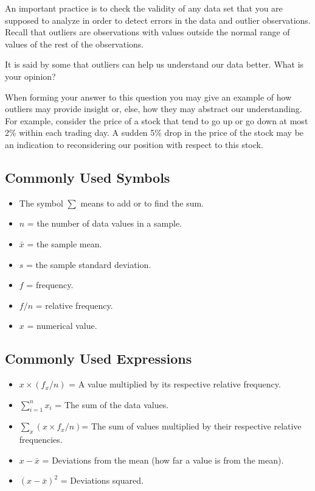\documentclass[]{krantz}
\theoremstyle{definition}
\theoremstyle{definition}
\theoremstyle{definition}
\theoremstyle{remark}
\begin{document}
An important practice is to check the validity of any data set that you
are supposed to analyze in order to detect errors in the data and
outlier observations. Recall that outliers are observations with values
outside the normal range of values of the rest of the observations.

It is said by some that outliers can help us understand our data better.
What is your opinion?

When forming your answer to this question you may give an example of how
outliers may provide insight or, else, how they may abstract our
understanding. For example, consider the price of a stock that tend to
go up or go down at most 2\% within each trading day. A sudden 5\% drop in
the price of the stock may be an indication to reconsidering our
position with respect to this stock.

\hypertarget{commonly-used-symbols}{%
\subsection*{Commonly Used Symbols}\label{commonly-used-symbols}}


\begin{itemize}
\item
  The symbol \(\sum\) means to add or to find the sum.
\item
  \(n\) = the number of data values in a sample.
\item
  \(\bar x\) = the sample mean.
\item
  \(s\) = the sample standard deviation.
\item
  \(f\) = frequency.
\item
  \(f/n\) = relative frequency.
\item
  \(x\) = numerical value.
\end{itemize}

\hypertarget{commonly-used-expressions}{%
\subsection*{Commonly Used Expressions}\label{commonly-used-expressions}}


\begin{itemize}
\item
  \(x \times (f_x/n)\) = A value multiplied by its respective relative
  frequency.
\item
  \(\sum_{i=1}^n x_i\) = The sum of the data values.
\item
  \(\sum_x (x \times f_x/n)\)= The sum of values multiplied by their
  respective relative frequencies.
\item
  \(x - \bar x\) = Deviations from the mean (how far a value is from the
  mean).
\item
  \((x - \bar x)^2\) = Deviations squared.
\end{itemize}
\end{document}

